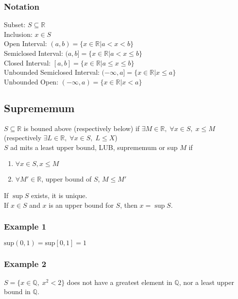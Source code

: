\documentclass[11pt]{article}
\newcommand{\0}{\emptyset}
\newcommand{\Q}{\mathbb{Q}}
\newcommand{\R}{\mathbb{R}}
\begin{document}
\subsubsection*{Notation}
\label{sec:org7c36467}
Subset: \(S\subseteq\R\)\\[0pt]
Inclusion: \(x\in S\)\\[0pt]
Open Interval: \((a,b)=\{x\in\R|a<x<b\}\)\\[0pt]
Semiclosed Interval: \((a,b]=\{x\in\R|a<x\leq b\}\)\\[0pt]
Closed Interval: \([a,b]=\{x\in\R|a\leq x\leq b\}\)\\[0pt]
Unbounded Semiclosed Interval: \((-\infty,a]=\{x\in\R|x\leq a\}\)\\[0pt]
Unbounded Open: \((-\infty,a)=\{x\in\R|x< a\}\)\\[0pt]
\subsection*{Suprememum}
\label{sec:org43c861f}
\(S\subseteq\R\) is bouned above (respectively below) if \(\exists M\in\R,\;\forall x\in S,\;x\leq M\) (respectively \(\exists L\in\R,\;\forall x\in S,\; L\leq X\))\\[0pt]
\(S\) ad mits a least upper bound, LUB, suprememum or sup \(M\) if\\[0pt]
\begin{enumerate}
\item \(\forall x\in S,x\leq M\)\\[0pt]
\item \(\forall M'\in\R\), upper bound of \(S\), \(M\leq M'\)\\[0pt]
\end{enumerate}
If \(\sup{S}\) exists, it is unique.\\[0pt]
If \(x\in S\) and \(x\) is an upper bound for \(S\), then \(x=\sup{S}\).\\[0pt]
\subsubsection*{Example 1}
\label{sec:org98f987e}
\(\text{sup}(0,1)=\text{sup}[0,1]=1\)\\[0pt]
\subsubsection*{Example 2}
\label{sec:orgcd35874}
\(S=\{x\in\Q,\;x^{2}<2\}\) does not have a greatest element in \(\Q\), nor a least upper bound in \(\Q\).\\[0pt]
\end{document}
